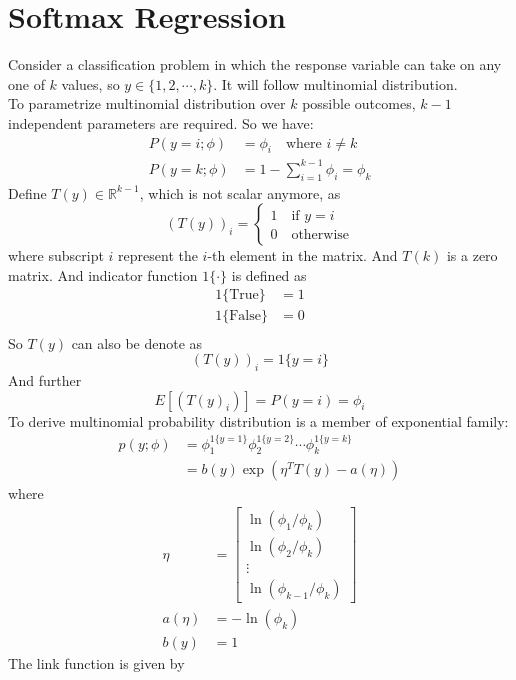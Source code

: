 \documentclass[10pt,a4paper,oneside]{article}
\begin{document}
\section{Softmax Regression}
Consider a classification problem in which the response variable can take on any one of $k$ values, so $y \in \{1, 2, \cdots, k \}$. It will follow multinomial distribution.\\
To parametrize multinomial distribution over $k$ possible outcomes, $k-1$ independent parameters are required. So we have:
\begin{align*}
P(y=i;\phi) &= \phi_i \quad \text{where }i\neq k\\
P(y=k; \phi) &= 1 - \sum_{i=1}^{k-1} \phi_i = \phi_k
\end{align*}
Define $T(y) \in \mathbb{R}^{k-1}$, which is not scalar anymore, as
\begin{equation*}
(T(y))_i =\left\lbrace
	\begin{array}{lr}
	1 \quad \text{if $y=i$}\\ 
	0\quad \text{otherwise}
	\end{array} 
\right.
\end{equation*}
where subscript $i$ represent the $i$-th element in the matrix. And $T(k)$ is a zero matrix. And indicator function $1\{\cdot\}$ is defined as
\begin{align*}
	1\{\text{True}\} &= 1\\
	1\{\text{False}\} &= 0\\
\end{align*}
So $T(y)$ can also be denote as
\[
(T(y))_i = 1\{y=i\}
\]
And further
\[
E[(T(y)_i)] = P(y=i) = \phi_i
\]
To derive multinomial probability distribution is a member of exponential family:
\begin{align*}
p(y;\phi) &= \phi_1 ^{1\{y=1\}}\phi_2 ^{1\{y=2\}} \cdots \phi_k ^{1\{y=k\}}\\
&= b(y) \exp (\eta^T T(y) - a(\eta))
\end{align*}
where
\begin{align*}
\eta &= \begin{bmatrix}
\ln (\phi_1 / \phi_k)\\ 
\ln (\phi_2 / \phi_k) \\ 
\vdots \\ 
\ln (\phi_{k-1} / \phi_k)
\end{bmatrix} \\
a(\eta) &= -\ln(\phi_k)\\
b(y) &= 1
\end{align*}
The link function is given by
\end{document}
